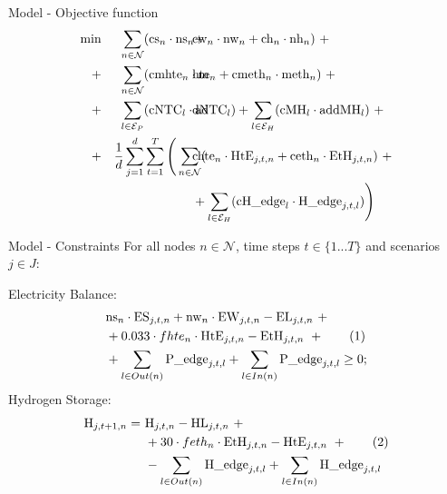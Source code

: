 \begin{frame}{Model - Objective function}
  \small
  \begin{align*}
    \min 
    &&\sum_{n\in\cN}&(\text{cs}_n \cdot \text{ns}_n+\hspace{-2.3em}&&\text{cw}_n \cdot \text{nw}_n + \text{ch}_n \cdot \text{nh}_n )\ + \\
    +&& \sum_{n\in\cN}&(\text{cmhte}_n\cdot\text{m} \hspace{-2.3em}&& \text{hte}_n + \text{cmeth}_n\cdot \text{meth}_n) \ + \\
    +&& \sum_{l\in\cE_P}& (\text{cNTC}_l\cdot \text{ad}\hspace{-2.3em}&&\text{dNTC}_l) 
    + \sum_{l\in\cE_H} (\text{cMH}_l\cdot \text{addMH}_l) \ + \\   
    +&&\frac{1}{d}\sum_{j=1}^{d}&\sum_{t=1}^{T} \Bigg(\sum_{n\in\cN} (\hspace{-2.3em} &&
    \text{chte}_n \cdot \text{HtE}_{j,t,n} + \text{ceth}_n \cdot \text{EtH}_{j,t,n})\ + \\
    &&&\hspace{-3em}&&+\sum_{l\in\cE_H} (\text{cH\_edge}_l\cdot\text{H\_edge}_{j,t,l}) \Bigg)
\end{align*}

\end{frame}

  \begin{frame}{Model - Constraints}
    For all nodes $n\in\mathcal{N}$, time steps $t\in\{1...T\}$ and scenarios $j\in J$: \vspace{1em}
    
    Electricity Balance: \vspace{-.5em}
    \begin{align*}
       &\text{ns}_n \cdot \text{ES}_{j,t,n}+ \text{nw}_n \cdot \text{EW}_{j,t,n} - \text{EL}_{j,t,n} \ + \\
       &+ 0.033 \cdot fhte_n \cdot \text{HtE}_{j,t,n} - \text{EtH}_{j,t,n}\ + \stepcounter{equation}\tag{\theequation}\label{constr_P}\\
       &+ \sum_{l\in Out(n)}\text{P\_}\text{edge}_{j,t,l} + \sum_{l\in In(n)} \text{P\_edge}_{j,t,l} \ge 0;
    \end{align*} 
    Hydrogen Storage: \vspace{-.5em}
    \begin{align*}
       \text{H}_{j,t+1,n} =\ & \text{H}_{j,t,n} - \text{HL}_{j,t,n}\ +\\ 
      & + 30 \cdot feth_n \cdot \text{EtH}_{j,t,n} - \text{HtE}_{j,t,n} \ + \stepcounter{equation}\tag{\theequation}\label{constr_H}\\
      & - \sum_{l\in Out(n)}\text{H\_edge}_{j,t,l} + \sum_{l\in In(n)}\text{H\_edge}_{j,t,l}
    \end{align*}
\end{frame}

